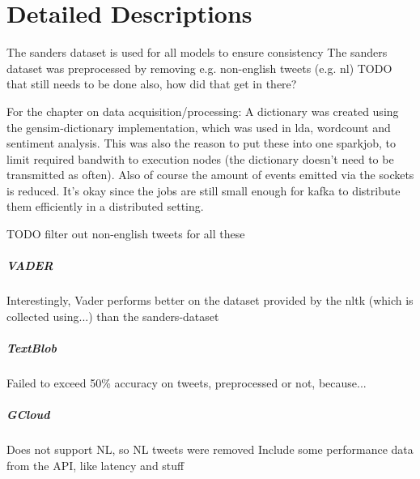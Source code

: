 \chapter{Detailed Descriptions}
\label{chapter:DetailedDescriptions}\label{sentimentanalysis}

The sanders dataset is used for all models to ensure consistency
The sanders dataset was preprocessed by removing e.g. non-english tweets (e.g. nl)
TODO that still needs to be done
also, how did that get in there?

For the chapter on data acquisition/processing: A dictionary was created using the gensim-dictionary implementation, which was used in lda, wordcount and sentiment analysis.
This was also the reason to put these into one sparkjob, to limit required bandwith to execution nodes (the dictionary doesn't need to be transmitted as often).
Also of course the amount of events emitted via the sockets is reduced.
It's okay since the jobs are still small enough for kafka to distribute them efficiently in a distributed setting.



TODO filter out non-english tweets for all these

\paragraph{VADER}
Interestingly, Vader performs better on the dataset provided by the nltk (which is collected using...) than the sanders-dataset

\paragraph{TextBlob}
Failed to exceed 50\% accuracy on tweets, preprocessed or not, because...

\paragraph{GCloud}
Does not support NL, so NL tweets were removed
Include some performance data from the API, like latency and stuff

\newpage
